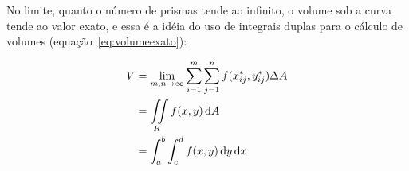No limite, quanto o número de prismas tende ao infinito, o volume sob
a curva tende ao valor exato, e essa é a idéia do uso de integrais
duplas para o cálculo de volumes (equação~\ref{eq:volumeexato}):

\begin{equation}
  \label{eq:volumeexato}
  \begin{split}
      V &= \lim_{m, n \to \infty} \sum_{i=1}^m \sum_{j=1}^n f(x_{ij}^*,
      y_{ij}^*) \Delta A\\
        &= \iint\displaylimits_R f(x, y) \mathop{}\!\mathrm{d} A\\
        &= \int_a^b \int_c^d f(x, y) \mathop{}\!\mathrm{d} y \mathop{}\!\mathrm{d} x
  \end{split}
\end{equation}
